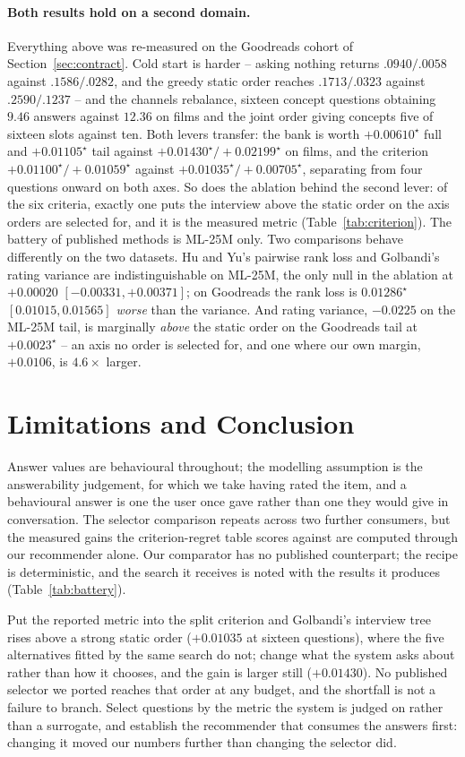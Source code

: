 \documentclass[runningheads]{llncs}
\begin{document}
\paragraph{Both results hold on a second domain.}
Everything above was re-measured on the Goodreads cohort of
Section~\ref{sec:contract}. Cold start is harder -- asking nothing returns $.0940/.0058$ against
$.1586/.0282$, and the greedy static order reaches $.1713/.0323$ against $.2590/.1237$ -- and the
channels rebalance, sixteen concept questions obtaining $9.46$ answers against $12.36$ on films and
the joint order giving concepts five of sixteen slots against ten. Both levers transfer: the bank is
worth $+0.00610^\star$ full and $+0.01105^\star$ tail against $+0.01430^\star/+0.02199^\star$ on
films, and the criterion $+0.01100^\star/+0.01059^\star$ against $+0.01035^\star/+0.00705^\star$,
separating from four questions onward on both axes. So does the ablation behind the second lever: of
the six criteria, exactly one puts the interview above the static order on the axis orders are
selected for, and it is the measured metric (Table~\ref{tab:criterion}). The battery of published
methods is ML-25M only. Two comparisons behave differently on the two datasets. Hu and Yu's pairwise
rank loss and Golbandi's rating variance are indistinguishable on ML-25M, the only null in the
ablation at $+0.00020$ $[-0.00331,+0.00371]$; on Goodreads the rank loss is $0.01286^\star$
$[0.01015,0.01565]$ \emph{worse} than the variance. And rating variance, $-0.0225$ on the ML-25M
tail, is marginally \emph{above} the static order on the Goodreads tail at $+0.0023^\star$ -- an axis
no order is selected for, and one where our own margin, $+0.0106$, is $4.6\times$ larger.


\section{Limitations and Conclusion}
\label{sec:limits}

Answer values are behavioural throughout; the modelling assumption is the answerability judgement,
for which we take having rated the item, and a behavioural answer is one the user once gave rather
than one they would give in conversation. The selector comparison repeats across two further consumers, but the measured gains
the criterion-regret table scores against are computed through our recommender alone. Our comparator has no published counterpart; the recipe is
deterministic, and the search it receives is noted with the results it produces
(Table~\ref{tab:battery}).

\medskip\noindent
Put the reported metric into the split criterion and Golbandi's interview tree rises above a strong
static order ($+0.01035$ at sixteen questions), where the five alternatives fitted by the same
search do not; change what the system asks about rather than how it chooses, and the gain is larger
still ($+0.01430$). No published selector we ported reaches that order at any budget, and the
shortfall is not a failure to branch. Select questions by the metric the system is judged on rather
than a surrogate, and establish the recommender that consumes the answers first: changing it moved
our numbers further than changing the selector did.



\end{document}

